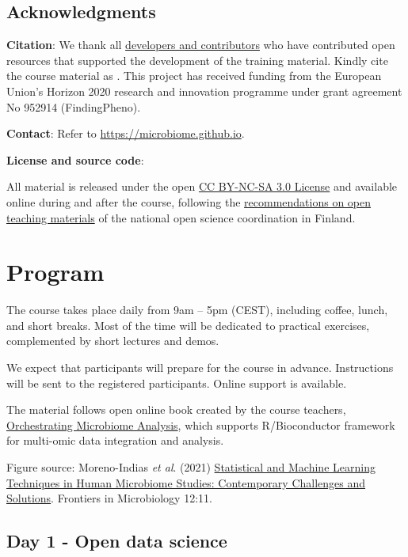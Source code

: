 \documentclass[
  oneside]{book}
\begin{document}
\hypertarget{acknowledgments}{%
\section{Acknowledgments}\label{acknowledgments}}

\textbf{Citation}: We thank all \href{https://microbiome.github.io}{developers and contributors} who have contributed open resources that supported the development of the training material. Kindly cite the course material as \citet{miacourse}. This project has received funding from the European Union's Horizon 2020 research and innovation programme under grant agreement No 952914 (FindingPheno).

\textbf{Contact}: Refer to \url{https://microbiome.github.io}.

\textbf{License and source code}:

All material is released under the open \href{LICENSE}{CC BY-NC-SA 3.0 License} and available online during and after the course, following the \href{https://avointiede.fi/fi/linjaukset-ja-aineistot/kotimaiset-linjaukset/oppimisen-ja-oppimateriaalien-avoimuuden-linjaus}{recommendations on open teaching materials} of the national open science coordination in Finland.

\hypertarget{program}{%
\chapter{Program}\label{program}}

The course takes place daily from 9am -- 5pm (CEST), including coffee,
lunch, and short breaks. Most of the time will be dedicated to
practical exercises, complemented by short lectures and demos.

We expect that participants will prepare for the course in advance.
Instructions will be sent to the registered participants. Online
support is available.

The material follows open online book created by the course teachers,
\href{https://microbiome.github.io/OMA}{Orchestrating Microbiome Analysis},
which supports R/Bioconductor framework for multi-omic data
integration and analysis.

Figure source: Moreno-Indias \emph{et al}. (2021) \href{https://doi.org/10.3389/fmicb.2021.635781}{Statistical and Machine Learning Techniques in Human Microbiome Studies: Contemporary Challenges and Solutions}. Frontiers in Microbiology 12:11.

\hypertarget{day-1---open-data-science}{%
\section{Day 1 - Open data science}\label{day-1---open-data-science}}
\end{document}
